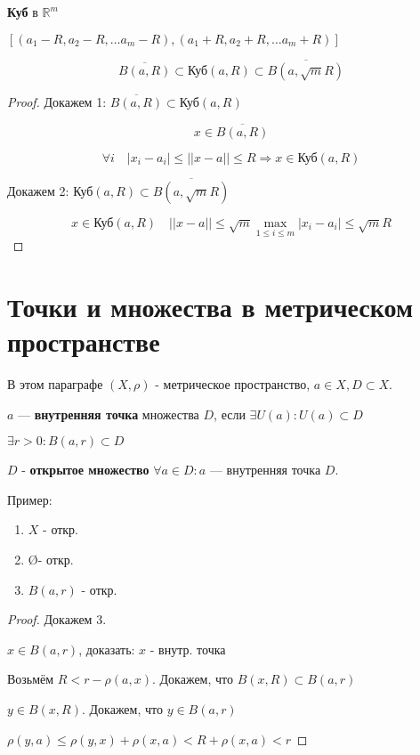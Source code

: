 \begin{definition}
    \textbf{Куб} в $\mathbb{R}^m$

    $[(a_1-R,a_2-R,\ldots a_m-R), (a_1+R,a_2+R,\ldots a_m+R)]$
\end{definition}

$$\overline{B(a,R)}\subset\text{Куб}(a,R)\subset \overline{B(a,\sqrt mR)}$$

\begin{proof}
    Докажем 1: $\overline{B(a,R)}\subset\text{Куб}(a,R)$

    $$x\in \overline{B(a,R)}$$

    $$\forall i \quad |x_i-a_i|\leq ||x-a||\leq R \Rightarrow x\in\text{Куб}(a,R)$$

    Докажем 2: $\text{Куб}(a,R)\subset \overline{B(a,\sqrt mR)}$

    $$x\in\text{Куб}(a,R)\quad ||x-a||\leq\sqrt m \max\limits_{1\leq i\leq m} |x_i-a_i|\leq \sqrt mR$$
\end{proof}

\section{Точки и множества в метрическом пространстве}

В этом параграфе $(X,\rho)$ - метрическое пространство, $a\in X, D\subset X$.

\begin{definition}
    $a$ --- \textbf{внутренняя точка} множества $D$, если $\exists U(a) : U(a)\subset D$

    $\exists r>0 : B(a,r)\subset D$
\end{definition}

\begin{definition}
    $D$ - \textbf{открытое множество} $\forall a\in D : a$ --- внутренняя точка $D$. 
\end{definition}

Пример:
\begin{enumerate}
    \itemsep0em
    \item $X$ - откр.
    \item \O - откр.
    \item $B(a,r)$ - откр.
\end{enumerate}

\begin{proof}
    Докажем 3.

    $x\in B(a,r)$, доказать: $x$ - внутр. точка

    Возьмём $R<r-\rho(a,x)$. Докажем, что $B(x,R)\subset B(a,r)$

    $y\in B(x,R)$. Докажем, что $y\in B(a,r)$

    $\rho(y,a)\leq\rho(y,x)+\rho(x,a)<R+\rho(x,a)<r$
\end{proof}


